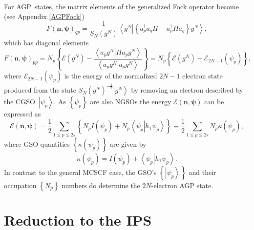 \documentclass[aps,preprint]{revtex4}%
\begin{document}
For AGP\ states, the matrix elements of the generalized Fock operator become
(see Appendix \ref{AGPFock})
\begin{equation}
F\left(  \boldsymbol{n},\boldsymbol{\psi}\right)  _{qp}=\frac{1}{S_{N}\left(
g^{N}\right)  }\left\langle \left.  g^{N}\right\vert \left\{  a_{p}^{\dagger
}a_{q}H-a_{p}^{\dagger}Ha_{q}\right\}  g^{N}\right\rangle ,
\end{equation}
which has diagonal elements
\begin{equation}
F\left(  \boldsymbol{n},\boldsymbol{\psi}\right)  _{pp}=N_{p}\left\{
\mathcal{E}\left(  g^{N}\right)  -\frac{\left\langle \left.  a_{p}%
g^{N}\right\vert Ha_{p}g^{N}\right\rangle }{\left\langle \left.  a_{p}%
g^{N}\right\vert a_{p}g^{N}\right\rangle }\right\}  =N_{p}\left\{
\mathcal{E}\left(  g^{N}\right)  -\mathcal{E}_{2N-1}\left(  \psi_{p}\right)
\right\}  ,
\end{equation}
where $\mathcal{E}_{2N-1}\left(  \psi_{p}\right)  $ is the energy of the
normalized $2N-1$ electron state produced from the state $S_{N}\left(
g^{N}\right)  ^{-\frac{1}{2}}\left\vert g^{N}\right\rangle $ by removing an
electron described by the CGSO\ $\left\vert \psi_{p}\right\rangle $. As
$\left\{  \psi_{p}\right\}  $ are also NGSOs the energy $\mathcal{E}\left(
\boldsymbol{n},\boldsymbol{\psi}\right)  $ can be expressed as
\begin{equation}
\mathcal{E}\left(  \boldsymbol{n},\boldsymbol{\psi}\right)  =\frac{1}{2}%
\sum_{1\leq p\leq2s}\left\{  N_{p}I\left(  \psi_{p}\right)  +N_{p}\left\langle
\left.  \psi_{p}\right\vert h_{1}\psi_{p}\right\rangle \right\}  \equiv
\frac{1}{2}%
{\textstyle\sum\limits_{1\leq p\leq2s}}
N_{p}\kappa\left(  \psi_{p}\right)  ,
\end{equation}
where GSO quantities $\left\{  \kappa\left(  \psi_{p}\right)  \right\}  $ are
given by
\begin{equation}
\kappa\left(  \psi_{p}\right)  =I\left(  \psi_{p}\right)  +\left\langle
\left.  \psi_{p}\right\vert h_{1}\psi_{p}\right\rangle .
\end{equation}
In contrast to the general MCSCF case, the GSO's $\left\{  \left\vert \psi
_{p}\right\rangle \right\}  $ and their occupation $\left\{  N_{p}\right\}  $
numbers do determine the $2N$-electron AGP state.

\section{Reduction to the IPS \label{IPS}}
\end{document}
